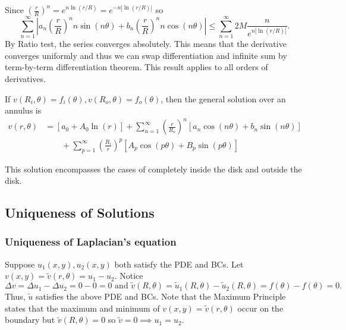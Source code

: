 \documentclass[class=article,crop=false]{standalone}
\begin{document}
Since $ \left( \frac{r}{R} \right)^{n} = e^{n \ln( r /R)} = e^{-n |\ln( r /R)|}$ so
\[
	\sum_{ n= 1}^{\infty} \left| a_n \left( \frac{r}{R} \right)^{n} n \sin(n\theta ) + b_n \left( \frac{r}{R} \right)^{n} n \cos(n \theta )  \right| \leq \sum_{ n= 1}^{\infty} 2M \frac{n}{e^{n |\ln(r /R)|}}
.\] 
By Ratio test, the series converges absolutely. This means that the derivative converges uniformly and thus we can swap differentiation and infinite sum by term-by-term differentiation theorem. This result applies to all orders of derivatives.


\begin{thm}
	If $ v(R_i, \theta)=f_i (\theta), v(R_{o}, \theta)=f_{o}(\theta)$, then the general solution over an annulus is
	\begin{align*}
		v(r, \theta) &= [a_0 + A_0 \ln(r)] + \sum_{ n= 1}^{\infty} \left( \frac{r}{R_{o}} \right)^{n} [a_n \cos(n\theta )+b_n \sin(n\theta )] \\
			     &\qquad + \sum_{ p= 1}^{\infty} \left( \frac{R_i}{r} \right)^{p} [A_p \cos(p\theta )+ B_p \sin(p\theta )] 
	\end{align*} 
\end{thm}
\begin{note}[]
This solution encompasses the cases of completely inside the disk and outside the disk.
\end{note}

\subsection{Uniqueness of Solutions}

\subsubsection{Uniqueness of Laplacian's equation}
Suppose $ u_1(x,y), u_2(x,y)$ both satisfy the PDE and BCs. Let $ v(x,y) = \tilde{v}(r,\theta) = u_1-u_2$. Notice
\[
	\Delta v= \Delta u_1 - \Delta u_2 = 0 - 0 =0 \text{ and } \tilde{v}(R,\theta)=\tilde{u}_1(R,\theta)-\tilde{u}_2(R,\theta) = f(\theta)-f(\theta)=0 
.\] 
Thus, $ \tilde{u}$ satisfies the above PDE and BCs. Note that the Maximum Principle states that the maximum and minimum of  $ v(x,y)=\tilde{v}(r,\theta)$ occur on the boundary but  $ \tilde{v}(R,\theta)=0$ so $ \tilde{v}=0 \implies u_1=u_2$.
\end{document}
